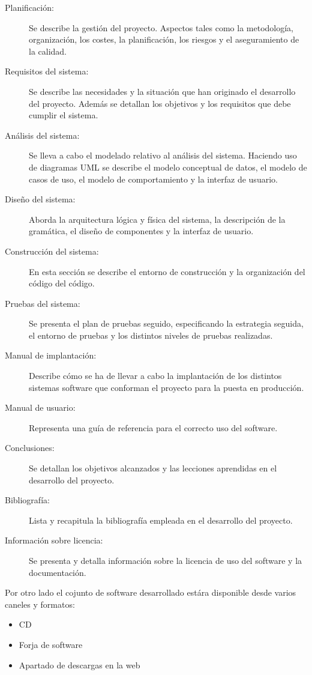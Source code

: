\begin {description}
\item [Planificación:] Se describe la gestión del proyecto. Aspectos tales como la metodología, organización, 
los costes, la planificación, los riesgos y el aseguramiento de la calidad. 
\item [Requisitos del sistema:] Se describe las necesidades y la situación que han originado el desarrollo del proyecto. Además 
se detallan los objetivos y los requisitos que debe cumplir el sistema. 
\item [Análisis del sistema:] Se lleva a cabo el modelado  relativo al análisis del sistema. Haciendo uso de diagramas UML se 
describe el modelo conceptual de datos, el modelo de casos de uso, el modelo de comportamiento y la interfaz de usuario. 
\item [Diseño del sistema:] Aborda la arquitectura lógica y física del sistema, la descripción de la gramática, el diseño de componentes y la
interfaz de usuario.
\item [Construcción del sistema:] En esta sección se describe el entorno de construcción y la organización del código del código.
\item [Pruebas del sistema:] Se presenta el plan de pruebas seguido, especificando la estrategia seguida, el entorno de pruebas y los distintos
niveles de pruebas realizadas.
\item [Manual de implantación:] Describe cómo se ha de llevar a cabo la implantación de los distintos sistemas software que 
conforman el proyecto para la puesta en producción. 
\item [Manual de usuario:] Representa una guía de referencia para el correcto uso del software.
\item [Conclusiones:] Se detallan los objetivos alcanzados y las lecciones aprendidas en el desarrollo del proyecto.
\item [Bibliografía:] Lista y recapitula la bibliografía empleada en el desarrollo del proyecto.
\item [Información sobre licencia:] Se presenta y detalla información sobre la licencia de uso del software y la documentación.
\end{description}

Por otro lado el cojunto de software desarrollado estára disponible desde varios caneles y formatos:
\begin{itemize}
\item CD 
\item Forja de software
\item Apartado de descargas en la web
\end{itemize}
